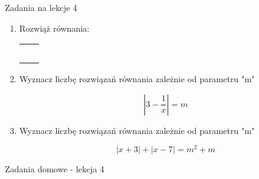 \documentclass[12pt,a4paper]{article}
\begin{document}
	
	\begin{center}
		\LARGE Zadania na lekcje 4
	\end{center}
	\vspace{1.5cm}
	
	\begin{enumerate}[1.]
		\item Rozwiąż równania:
		
		\begin{enumerate}[a)] \begin{tabular}{p{7cm} p{7cm}} 
				\item $|3x-4|=7$ & \vspace{0.4cm} 	\item$2|x+6|=-4$ \\
				\item $|2x-3|-|3x+3|=x-6$ & \item $2-|x+4|=x^2+3x-2$ \\
				\item $x^2+4x+|x+2|=16$ & \item $x^2+2x+2=2|x+1|$ \\
				\item $(x+1)(|x|-1)=-0,5$ & \item $|x^2+2x+3|=|2x|$ \\
				\item $|x^2-4x+3|=1 $ & \item $x^2-7|x|+10\leq 10 $ \\
		\end{tabular} \end{enumerate}
	
		\item Wyznacz liczbę rozwiązań równania zależnie od parametru "m"
		
		$$|3-\frac{1}{x}|=m$$
		
		\item Wyznacz liczbę rozwiązań równania zależnie od parametru "m"
		
		$$|x+3|+|x-7|=m^2+m $$

	\end{enumerate}
	
	\newpage
	
	\begin{center}
		\LARGE Zadania domowe - lekcja 4
	\end{center}
	\vspace{1.5cm}
	
\end{document}
